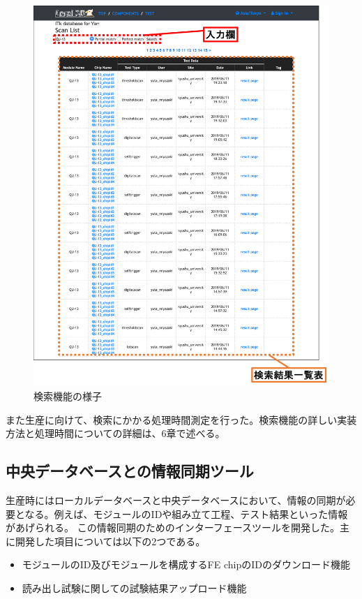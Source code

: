 \begin{figure}[bpt]\centering
\includegraphics[width=12cm]{webapp_search_function}
\caption[検索機能の様子]{検索機能の様子}
\label{webapp_search_function}
\end{figure}

また生産に向けて、検索にかかる処理時間測定を行った。検索機能の詳しい実装方法と処理時間についての詳細は、6章で述べる。

\newpage
\subsection{中央データベースとの情報同期ツール}
生産時にはローカルデータベースと中央データベースにおいて、情報の同期が必要となる。例えば、モジュールのIDや組み立て工程、テスト結果といった情報があげられる。
この情報同期のためのインターフェースツールを開発した。主に開発した項目については以下の2つである。
\begin{itemize}
  \item モジュールのID及びモジュールを構成するFE chipのIDのダウンロード機能
  \item 読み出し試験に関しての試験結果アップロード機能
\end{itemize}

